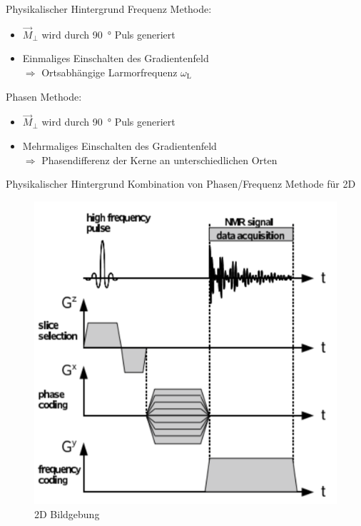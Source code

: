 \begin{frame}{Physikalischer Hintergrund}
Frequenz Methode:
	\begin{itemize}
	\item $\vec{M}_\bot$ wird durch \SI{90}{\degree} Puls generiert
	\item Einmaliges Einschalten des Gradientenfeld\\
	$\Rightarrow$ Ortsabhängige Larmorfrequenz $\omega_\text{L}$
	\end{itemize}
\vspace{.5cm}
Phasen Methode:
	\begin{itemize}
	\item $\vec{M}_\bot$ wird durch \SI{90}{\degree} Puls generiert
	\item Mehrmaliges Einschalten des Gradientenfeld\\
	$\Rightarrow$ Phasendifferenz der Kerne an unterschiedlichen Orten
	\end{itemize}
\end{frame}

\begin{frame}{Physikalischer Hintergrund}
Kombination von Phasen/Frequenz Methode für 2D %
	\begin{figure}
	\centering
	\includegraphics[scale=.15]{images//signal.png}
	\caption{2D Bildgebung \cite{script_nmr}}
	\end{figure}
\end{frame}

